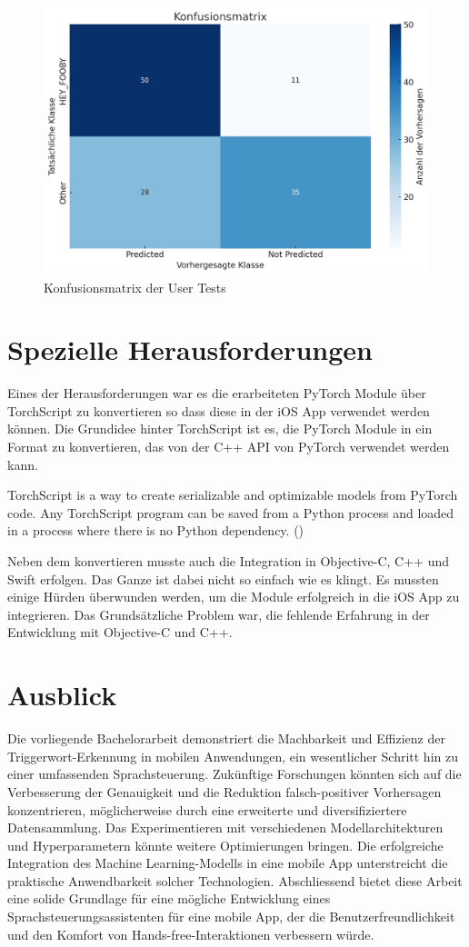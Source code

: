 \documentclass[11pt,a4paper]{article}
\begin{document}
\begin{figure}[H]
\centering
\includegraphics[width=.5\linewidth]{img/eval-usertests.png}
\caption{Konfusionsmatrix der User Tests}
\end{figure}


\section{Spezielle Herausforderungen}
Eines der Herausforderungen war es die erarbeiteten PyTorch Module über TorchScript zu konvertieren so dass diese in der iOS App verwendet werden können. Die Grundidee hinter TorchScript ist es, die PyTorch Module in ein Format zu konvertieren, das von der C++ API von PyTorch verwendet werden kann. 

\begin{displayquote}
TorchScript is a way to create serializable and optimizable models from PyTorch code. Any TorchScript program can be saved from a Python process and loaded in a process where there is no Python dependency. (\cite{pytorch2023jit})
\end{displayquote}

\noindent
Neben dem konvertieren musste auch die Integration in Objective-C, C++ und Swift erfolgen. Das Ganze ist dabei nicht so einfach wie es klingt. Es mussten einige Hürden überwunden werden, um die Module erfolgreich in die iOS App zu integrieren. Das Grundsätzliche Problem war, die fehlende Erfahrung in der Entwicklung mit Objective-C und C++.

\section{Ausblick}
Die vorliegende Bachelorarbeit demonstriert die Machbarkeit und Effizienz der Triggerwort-Erkennung in mobilen Anwendungen, ein wesentlicher Schritt hin zu einer umfassenden Sprachsteuerung. Zukünftige Forschungen könnten sich auf die Verbesserung der Genauigkeit und die Reduktion falsch-positiver Vorhersagen konzentrieren, möglicherweise durch eine erweiterte und diversifiziertere Datensammlung. Das Experimentieren mit verschiedenen Modellarchitekturen und Hyperparametern könnte weitere Optimierungen bringen. Die erfolgreiche Integration des Machine Learning-Modells in eine mobile App unterstreicht die praktische Anwendbarkeit solcher Technologien. Abschliessend bietet diese Arbeit eine solide Grundlage für eine mögliche Entwicklung eines Sprachsteuerungsassistenten für eine mobile App, der die Benutzerfreundlichkeit und den Komfort von Hands-free-Interaktionen verbessern würde.
\end{document}
